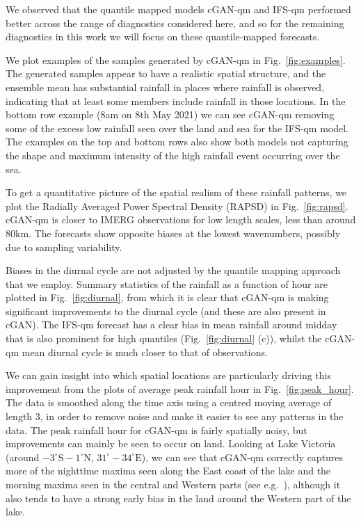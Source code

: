 \documentclass{article}
\begin{document}
We observed that the quantile mapped models cGAN-qm and IFS-qm performed better across the range of diagnostics considered here, and so for the remaining diagnostics in this work we will focus on these quantile-mapped forecasts.

We plot examples of the samples generated by cGAN-qm in Fig.~\ref{fig:examples}. The generated samples appear to have a realistic spatial structure, and the ensemble mean has substantial rainfall in places where rainfall is observed, indicating that at least some members include rainfall in those locations. In the bottom row example (8am on 8th May 2021) we can see cGAN-qm removing some of the excess low rainfall seen over the land and sea for the IFS-qm model. The examples on the top and bottom rows also show both models not capturing the shape and maximum intensity of the high rainfall event occurring over the sea. 

To get a quantitative picture of the spatial realism of these rainfall patterns, we plot the Radially Averaged Power Spectral Density (RAPSD) in Fig.~\ref{fig:rapsd}. cGAN-qm is closer to IMERG observations for low length scales, less than around 80km. The forecasts show opposite biases at the lowest wavenumbers, possibly due to sampling variability.

Biases in the diurnal cycle are not adjusted by the quantile mapping approach that we employ. Summary statistics of the rainfall as a function of hour are plotted in Fig.~\ref{fig:diurnal}, from which it is clear that cGAN-qm is making significant improvements to the diurnal cycle (and these are also present in cGAN). The IFS-qm forecast has a clear bias in mean rainfall around midday that is also prominent for high quantiles (Fig.~\ref{fig:diurnal} (c)), whilst the cGAN-qm mean diurnal cycle is much closer to that of observations. 

We can gain insight into which spatial locations are particularly driving this improvement from the plots of average peak rainfall hour in Fig.~\ref{fig:peak_hour}. The data is smoothed along the time axis using a centred moving average of length 3, in order to remove noise and make it easier to see any patterns in the data. The peak rainfall hour for cGAN-qm is fairly spatially noisy, but improvements can mainly be seen to occur on land. Looking at Lake Victoria (around $-3^{\circ}\text{S}-1^{\circ}\text{N}$, $31^{\circ}-34^{\circ}\text{E}$), we can see that cGAN-qm correctly captures more of the nighttime maxima seen along the East coast of the lake and the morning maxima seen in the central and Western parts (see e.g.~\cite{woodhams_identifying_2019}), although it also tends to have a strong early bias in the land around the Western part of the lake.
\end{document}
